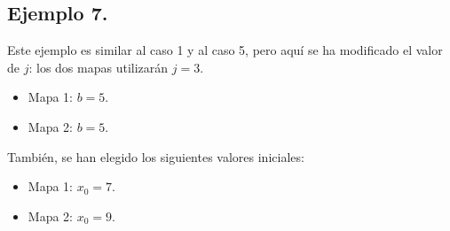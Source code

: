 \documentclass[10pt]{IEEEtran}
\begin{document}
\subsection{Ejemplo 7.}
Este ejemplo es similar al caso 1 y al caso 5, pero aquí se ha modificado el valor de $j$: los dos mapas utilizarán $j=3$. 

\begin{itemize}
\item Mapa 1: $b =  5$.
\item Mapa 2: $b =  5$.
\end{itemize}

También, se han elegido los siguientes valores iniciales:

\begin{itemize}
\item Mapa 1: $x_{0} = 7$.
\item Mapa 2: $x_{0} = 9$.
\end{itemize}
\end{document}
